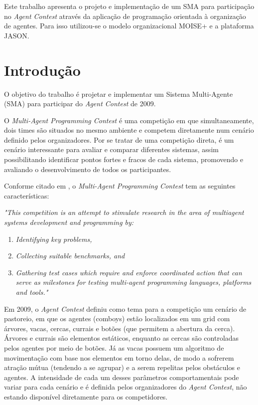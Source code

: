 \documentclass{llncs}
\renewenvironment{quote}{%
  \list{}{%
    \leftmargin3.0cm   %
    \rightmargin\leftmargin
  }
  \item\relax
}
{\endlist}
\begin{document}
\begin{abstract}
Este trabalho apresenta o projeto e implementação de um SMA para participação no \textit{Agent Contest} através da aplicação de programação orientada à organização de agentes. Para isso utilizou-se o modelo organizacional MOISE+ e a plataforma JASON.
\end{abstract}

\section{Introdução}


O objetivo do trabalho é projetar e implementar um Sistema Multi-Agente (SMA) para participar do \textit{Agent Contest} de 2009.

O \textit{Multi-Agent Programming Contest} é uma competição em que simultaneamente, dois times são situados no mesmo ambiente e competem diretamente num cenário definido pelos organizadores. Por se tratar de uma competição direta, é um cenário interessante para avaliar e comparar diferentes sistemas, assim possibilitando identificar pontos fortes e fracos de cada sistema, promovendo e avaliando o desenvolvimento de todos os participantes.

Conforme citado em \cite{AC}, o \textit{Multi-Agent Programming Contest} tem as seguintes características:

\begin{quote}
\textit{"This competition is an attempt to stimulate research in the area of multiagent systems development and programming by:}
\begin{enumerate}
\item \textit{Identifying key problems,}
\item \textit{Collecting suitable benchmarks, and}
\item \textit{Gathering test cases which require and enforce coordinated action that can serve as milestones for testing multi-agent programming languages, platforms and tools."}
\end{enumerate}
\end{quote}

Em 2009, o \textit{Agent Contest} definiu como tema para a competição um cenário de pastoreio, em que os agentes (comboys) estão localizados em um grid com árvores, vacas, cercas, currais e botões (que permitem a abertura da cerca). Árvores e currais são elementos estáticos, enquanto as cercas são controladas pelos agentes por meio de botões. Já as vacas possuem um algoritmo de movimentação com base nos elementos em torno delas, de modo a sofrerem atração mútua (tendendo a se agrupar) e a serem repelitas pelos obstáculos e agentes. A intensidade de cada um desses parâmetros comportamentais pode variar para cada cenário e é definida pelos organizadores do \textit{Agent Contest}, não estando disponível diretamente para os competidores.
\end{document}
